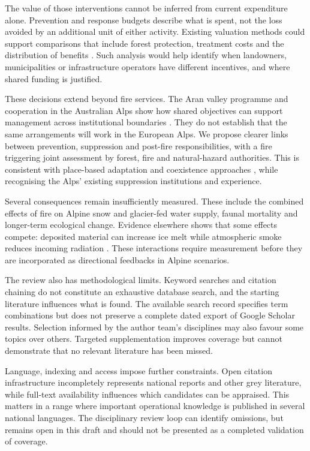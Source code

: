 \documentclass[11pt,a4paper]{article}
\begin{document}
The value of those interventions cannot be inferred from current expenditure alone. Prevention and response budgets describe what is spent, not the loss avoided by an additional unit of either activity. Existing valuation methods could support comparisons that include forest protection, treatment costs and the distribution of benefits \citep{accastello_asforesee_2019, moos_climate_2021}. Such analysis would help identify when landowners, municipalities or infrastructure operators have different incentives, and where shared funding is justified.

These decisions extend beyond fire services. The Aran valley programme and cooperation in the Australian Alps show how shared objectives can support management across institutional boundaries \citep{oliveres_path_2025, lockwood_biodiversity_2014}. They do not establish that the same arrangements will work in the European Alps. We propose clearer links between prevention, suppression and post-fire responsibilities, with a fire triggering joint assessment by forest, fire and natural-hazard authorities. This is consistent with place-based adaptation and coexistence approaches \citep{moritz_learning_2014}, while recognising the Alps' existing suppression institutions and experience.

Several consequences remain insufficiently measured. These include the combined effects of fire on Alpine snow and glacier-fed water supply, faunal mortality and longer-term ecological change. Evidence elsewhere shows that some effects compete: deposited material can increase ice melt while atmospheric smoke reduces incoming radiation \citep{aubrywake_fire_2022}. These interactions require measurement before they are incorporated as directional feedbacks in Alpine scenarios.

\label{sec:limitations}
The review also has methodological limits. Keyword searches and citation chaining do not constitute an exhaustive database search, and the starting literature influences what is found. The available search record specifies term combinations but does not preserve a complete dated export of Google Scholar results. Selection informed by the author team's disciplines may also favour some topics over others. Targeted supplementation improves coverage but cannot demonstrate that no relevant literature has been missed.

Language, indexing and access impose further constraints. Open citation infrastructure incompletely represents national reports and other grey literature, while full-text availability influences which candidates can be appraised. This matters in a range where important operational knowledge is published in several national languages. The disciplinary review loop can identify omissions, but remains open in this draft and should not be presented as a completed validation of coverage.
\end{document}
